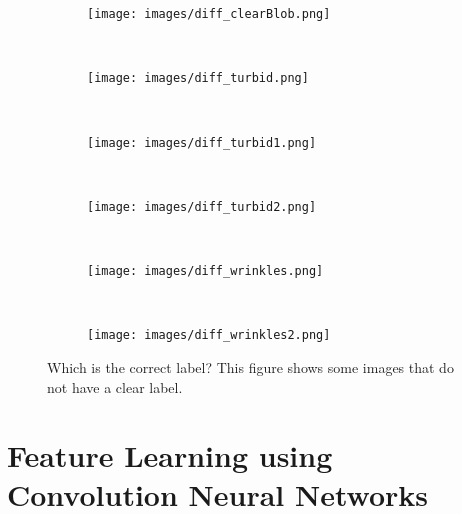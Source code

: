 \documentclass[review,12pt,3p]{elsarticle}
\begin{document}
\begin{figure}[!t]
        \centering
        \begin{subfigure}[b]{0.065\textwidth}
                \texttt{[image: images/diff\_clearBlob.png]}
                \caption{}\label{fig:example_1}
        \end{subfigure}%
        ~ %
        \begin{subfigure}[b]{0.065\textwidth}
                \texttt{[image: images/diff\_turbid.png]}
                \caption{}\label{fig:example_2}
        \end{subfigure}
        ~ %
        \begin{subfigure}[b]{0.065\textwidth}
                \texttt{[image: images/diff\_turbid1.png]}
                \caption{}\label{fig:example_3}
        \end{subfigure}
        ~
        \begin{subfigure}[b]{0.065\textwidth}
                \texttt{[image: images/diff\_turbid2.png]}
                \caption{}\label{fig:example_4}
        \end{subfigure}%
        ~ 
        \begin{subfigure}[b]{0.065\textwidth}
                \texttt{[image: images/diff\_wrinkles.png]}
                \caption{}\label{fig:example_5}
        \end{subfigure}
        ~
        \begin{subfigure}[b]{0.065\textwidth}
                \texttt{[image: images/diff\_wrinkles2.png]}
                \caption{}\label{fig:example_6}
        \end{subfigure}
        
        \caption{Which is the correct label? This figure shows some images that do not have a clear label.}
        \label{fig:difficultImages}
\end{figure}






\section{Feature Learning using Convolution Neural Networks}
\label{secMethodology}
\end{document}
